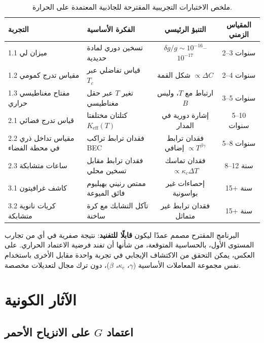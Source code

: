\documentclass[11pt,a4paper]{article}
\newcommand{\Keff}{K_{\mathrm{eff}}}
\begin{document}
	\begin{table}[htbp]
		\centering
		\caption{ملخص الاختبارات التجريبية المقترحة للجاذبية المعتمدة على الحرارة.}
		\label{tab:experiment-summary}
		\small
		\begin{tabularx}{\textwidth}{l X c c}
			\toprule
			\textbf{التجربة} & \textbf{الفكرة الأساسية} & \textbf{التنبؤ الرئيسي} & \textbf{المقياس الزمني} \\
			\midrule
			1.1 ميزان لي & تسخين دوري لمادة حديدية & \(\delta g/g \sim 10^{-16}\)–\(10^{-17}\) & 2–3 سنوات \\
			1.2 مقياس تدرج كمومي & قياس تفاضلي عبر \(T_c\) & شكل القمة \(\propto \Delta C\) & 2–4 سنوات \\
			1.3 مفتاح مغناطيسي حراري & تغير \(T\) عبر حقل مغناطيسي & ارتباط مع \(T\)، وليس \(B\) & 3–5 سنوات \\
			2.1 قياس تدرج فضائي & كتلتان مختلفتا \(\Keff(T)\) & إشارة دورية في المدار & 5–10 سنوات \\
			2.2 مقياس تداخل ذري في محطة الفضاء & فقدان ترابط تراكب BEC & فقدان ترابط إضافي \(\propto T^{\beta\gamma}\) & 5–8 سنوات \\
			2.3 ساعات متشابكة & فقدان ترابط مقابل تسخين محلي & فقدان تماسك \(\propto \kappa_c \Delta T\) & 8–12 سنة \\
			3.1 كاشف غرافيتون & ممتص رنيني بهيليوم فائق الميوعة & إحصاءات غير بواسونية & 15+ سنة \\
			3.2 كريات نانوية متشابكة & تآكل التشابك مع كرة ساخنة & فقدان ترابط غير متماثل & 15+ سنة \\
			\bottomrule
		\end{tabularx}
	\end{table}
	
	البرنامج المقترح مصمم عمدًا ليكون \textbf{قابلًا للتفنيد}: نتيجة صفرية في أي من تجارب المستوى الأول، بالحساسية المتوقعة، من شأنها أن تفند فرضية الاعتماد الحراري. على العكس، يمكن التحقق من الاكتشاف الإيجابي في تجربة واحدة مقابل الأخرى باستخدام نفس مجموعة المعاملات الأساسية ($\gamma$، $\kappa_c$، $\beta$)، دون ترك مجال لتعديلات مخصصة.
	
	
	\section{الآثار الكونية}
	\label{sec:cosmo}
	
	\subsection{اعتماد $G$ على الانزياح الأحمر}
	\label{subsec:cosmo-gz}
	
\end{document}
